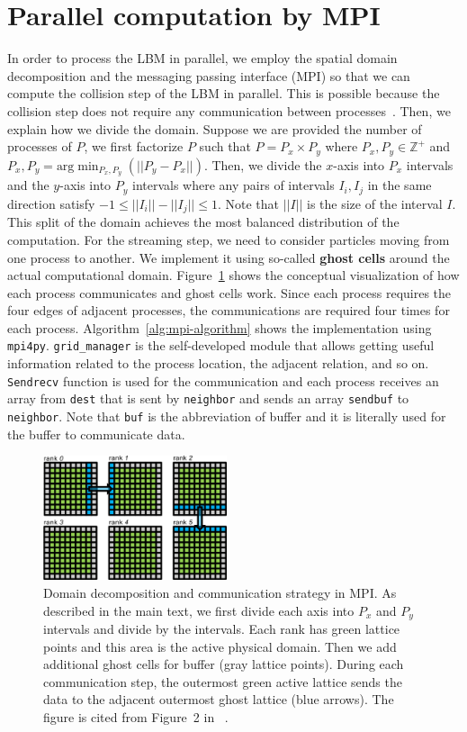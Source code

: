 \section{Parallel computation by MPI}\label{section-mpi}
In order to process the LBM in parallel,
we employ the spatial domain decomposition and
the messaging passing interface (MPI)
so that we can compute the collision step of the LBM
in parallel.
This is possible because the collision step does not require
any communication between processes~\cite{pastewka2019hpc}.
Then, we explain how we divide the domain.
Suppose we are provided the number of processes of $P$,
we first factorize $P$ such that $P = P_x \times P_y$
where $P_x, P_y \in \mathbb{Z}^{+}$
and $P_x, P_y = \text{arg} \min_{P_x, P_y}(|| P_y - P_x ||)$.
Then, we divide the $x$-axis into $P_x$ intervals and
the $y$-axis into $P_y$ intervals where
any pairs of intervals $I_{i}, I_{j}$ in the same direction satisfy
$-1 \leq || I_{i} || - ||I_{j}|| \leq 1$.
Note that $||I||$ is the size of the interval $I$.
This split of the domain achieves the most balanced distribution of
the computation.
For the streaming step, we need to consider particles
moving from one process to another.
We implement it using so-called {\bf ghost cells}
around the actual computational domain.
Figure~\ref{mpi-conceptual} shows the conceptual visualization of
how each process communicates and ghost cells work.
Since each process requires the four edges of adjacent
processes, the communications are required four times
for each process.
Algorithm~\ref{alg:mpi-algorithm}
shows the implementation using {\tt mpi4py}.
{\tt grid\_manager} is the self-developed module
that allows getting useful information related to
the process location, the adjacent relation, and so on.
{\tt Sendrecv} function is used for the communication and
each process receives an array from {\tt dest} that is sent
by {\tt neighbor} and sends an array {\tt sendbuf} to
{\tt neighbor}.
Note that {\tt buf} is the abbreviation of buffer and
it is literally used for the buffer to communicate data.

\begin{figure}
  \centering
  \includegraphics[width=0.48\textwidth]{imgs/mpi-conceptual.pdf}
  \caption{
    Domain decomposition and communication strategy in MPI.
    As described in the main text, we first divide each axis
    into $P_x$ and $P_y$ intervals and divide by the intervals.
    Each rank has green lattice points and this area is the active physical domain.
    Then we add additional ghost cells for buffer (gray lattice points).
    During each communication step, the outermost green active lattice
    sends the data to the adjacent outermost ghost lattice (blue arrows).
    The figure is cited from Figure~2 in ~\cite{pastewka2019hpc}.
  }
  \label{mpi-conceptual}
\end{figure}

